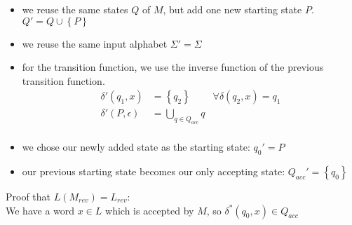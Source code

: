 \begin{itemize}
    \item we reuse the same states $Q$ of $M$, but add one new starting state $P$.\\
    $Q' = Q \cup \left\{P\right\}$
    \item we reuse the same input alphabet $\Sigma' = \Sigma$
    \item for the transition function, we use the inverse function of the previous transition function.\\
    \begin{align*}
        \delta'(q_{1}, x) &= \left\{q_{2}\right\}&\forall \delta(q_{2},x) = q_{1}\\
        \delta'(P, \epsilon) &= \bigcup_{q \in Q_{acc}} q\\
    \end{align*}
    \item we chose our newly added state as the starting state: $q_{0}' = P$
    \item our previous starting state becomes our only accepting state: $Q_{acc}' = \left\{q_{0}\right\}$
\end{itemize}
Proof that $L(M_{rev}) = L_{rev}$:\\
We have a word $x\in L$ which is accepted by $M$, so $\delta^{*}(q_{0},x)\in Q_{acc}$
